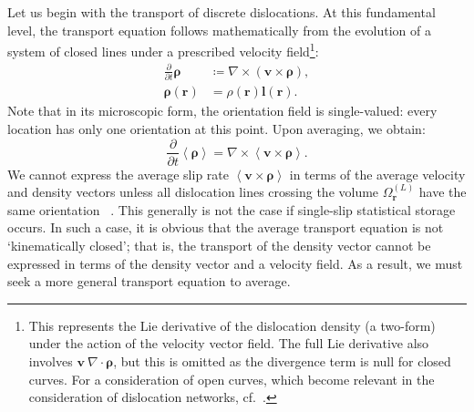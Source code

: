 Let us begin with the transport of discrete dislocations. At this fundamental level, the transport equation follows mathematically from the evolution of a system of closed lines under a prescribed velocity field\footnote{This represents the Lie derivative of the dislocation density (a two-form) under the action of the velocity vector field. The full Lie derivative also involves \(\boldsymbol{v\ }\nabla\cdot\boldsymbol{\rho}\), but this is omitted as the divergence term is null for closed curves. For a consideration of open curves, which become relevant in the consideration of dislocation networks, cf.~\cite{Starkey2022}.}:
\begin{align}
    \frac{\partial}{\partial t}\boldsymbol{\rho}&\coloneqq\nabla\times\left( \boldsymbol{v}\times\boldsymbol{\rho} \right),\\
    \boldsymbol{\rho}(\boldsymbol{r}) &=\rho\left( \boldsymbol{r} \right)\boldsymbol{l}\left( \boldsymbol{r} \right).
\end{align}
Note that in its microscopic form, the orientation field is single-valued: every location has only one orientation at this point. Upon averaging, we obtain:
\begin{equation}
\frac{\partial}{\partial t}\left\langle \boldsymbol{\rho} \right\rangle = \nabla \times \left\langle \boldsymbol{v} \times \boldsymbol{\rho} \right\rangle.\label{eq:7AvDynamics}
\end{equation}
We cannot express the average slip rate \(\left\langle \boldsymbol{v} \times \boldsymbol{\rho} \right\rangle\) in terms of the average velocity and density vectors unless all dislocation lines crossing the volume  $\Omega_{\boldsymbol{r}}^{(L)}$ have the same orientation ~\cite{Hochrainer2007,Hochrainer2015}. This generally is not the case if single-slip statistical storage occurs. In such a case, it is obvious that the average transport equation is not `kinematically closed'; that is, the transport of the density vector cannot be expressed in terms of the density vector and a velocity field. As a result, we must seek a more general transport equation to average.

